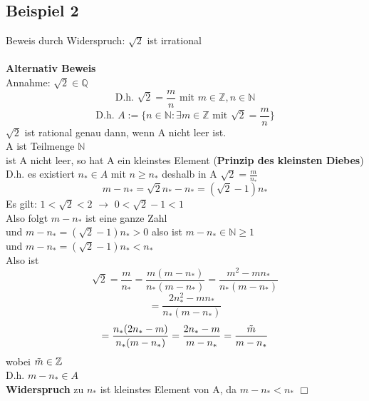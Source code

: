 \documentclass{article}
\begin{document}
        \subsection{Beispiel 2}
        Beweis durch Widerspruch: $\sqrt{2}$ ist irrational\\\\
        \textbf{Alternativ Beweis}\\
            Annahme: $\sqrt{2}\in \mathbb{Q}$\\
            $$\text{D.h. } \sqrt{2}=\frac{m}{n} \text{ mit }m \in \mathbb{Z}, n\in \mathbb{N}$$
            $$\text{D.h. } A:= \{ n\in \mathbb{N} : \exists m \in \mathbb{Z} \text{ mit } \sqrt{2}=\frac{m}{n}\}$$
            $\sqrt{2}$ ist rational genau dann, wenn A  nicht leer ist.\\
            A ist Teilmenge $\mathbb{N}$\\
            ist A nicht leer, so hat A ein kleinstes Element (\textbf{Prinzip des kleinsten Diebes})\\
            D.h. es existiert $n_*\in A$ mit $n \ge n_*$ deshalb in A $\sqrt{2}=\frac{m}{n_*}$\\
            $$m-n_*=\sqrt{2}n_*-n_*=(\sqrt{2}-1)n_*$$
            Es gilt: $1<\sqrt{2}<2$ $\to$ $0<\sqrt{2}-1< 1$\\
            Also folgt $m-n_*$ ist eine ganze Zahl\\
            und $m-n_*=(\sqrt{2}-1)n_*>0$ also ist $m-n_* \in \mathbb{N} \ge 1$\\
            und $m-n_*=(\sqrt{2}-1)n_*< n_*$\\
            Also ist
            $$\sqrt{2}=\frac{m}{n_*} =
            \frac{m(m-n_*)}{n_*(m-n_*)}=
            \frac{m^2-mn_*}{n_*(m-n_*)}$$
            $$=\frac{2n_*^2-mn_*}{n_*(m-n_*)}$$
            $$=\frac{n_*(2n_*-m)}{n_*(m-n_*)}=
            \frac{2n_*-m}{m-n_*}=
            \frac{\Tilde{m}}{m-n_*}$$
            wobei $\Tilde{m} \in \mathbb{Z}$\\
            D.h. $m-n_* \in A$\\
            \textbf{Widerspruch} zu $n_*$ ist kleinstes Element von A, da $m-n_*<n_*$
	    \hfill $\Box$
\end{document}
